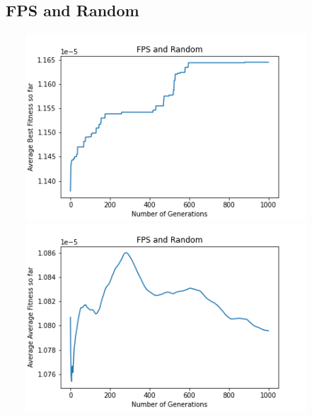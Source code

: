 \documentclass[a4paper]{article}
\begin{document}
\subsection{FPS and Random}
\includegraphics[width=12cm, height=7cm]{Graphs/TSP/fps_rand_bsf.png} \\
\includegraphics[width=12cm, height=7cm]{Graphs/TSP/fps_rand_avg.png} \\
\end{document}
